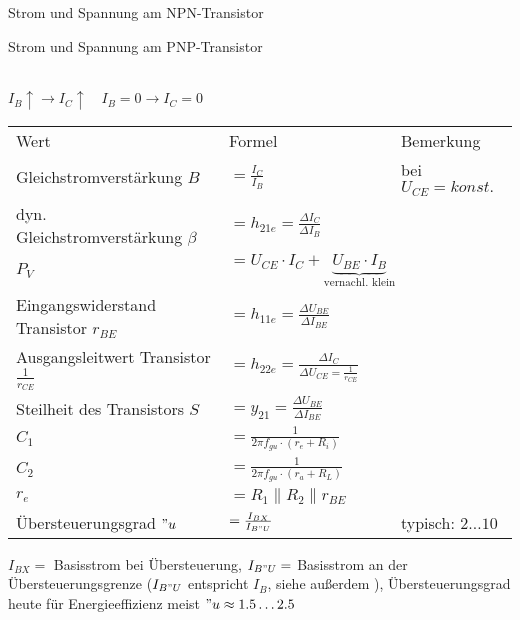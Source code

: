 
\begin{minipage}{0.5\columnwidth}
    Strom und Spannung am NPN-Transistor
\end{minipage}
\begin{minipage}{0.5\columnwidth}
    Strom und Spannung am PNP-Transistor    
\end{minipage}
\noindent\\
$I_B\uparrow\rightarrow I_C\uparrow\quad I_B=0\rightarrow I_C=0$
\renewcommand{\arraystretch}{1.0}
\begin{table}[H]
    \begin{tabularx}{\columnwidth}{l l l}
        Wert                                           & Formel                                                                   & Bemerkung \\
        Gleichstromverstärkung $B$                     & $=\frac{I_C}{I_B}$                                                       & bei $U_{CE}=konst.$ \\
        dyn. Gleichstromverstärkung $\beta$            & $=h_{21e}=\frac{\Delta I_C}{\Delta I_B}$                                 & \\
        $P_V$                                          & $=U_{CE}\cdot I_C + \underbrace{U_{BE}\cdot I_B}_\text{vernachl. klein}$ & \\
        Eingangswiderstand Transistor $r_{BE}$         & $=h_{11e}=\frac{\Delta U_{BE}}{\Delta I_{BE}}$                           & \\
        Ausgangsleitwert Transistor $\frac{1}{r_{CE}}$ & $=h_{22e}=\frac{\Delta I_C}{\Delta U_{CE}=\frac{1}{r_{CE}}}$             & \\
        Steilheit des Transistors $S$                  & $=y_{21}=\frac{\Delta U_{BE}}{\Delta I_{BE}}$                            & \\
        $C_1$                                          & $=\frac{1}{2\pi f_{gu}\cdot (r_e+R_i)}$                                  & \\
        $C_2$                                          & $=\frac{1}{2\pi f_{gu}\cdot (r_a+R_L)}$                                  & \\
        $r_e$                                          & $=R_1\parallel R_2\parallel r_{BE}$                                      & \\
        Übersteuerungsgrad $"u$                        & $=\frac{I_{BX}}{I_{B"U}}$                                                & typisch: $2\dots10$\\
    \end{tabularx}
\end{table}
$I_{BX}=$ Basisstrom bei Übersteuerung, $I_{B"U}=$ Basisstrom an der Übersteuerungsgrenze ($I_{B"U}$ entspricht $I_B$, siehe außerdem ), Übersteuerungsgrad heute für Energieeffizienz meist $"u\approx 1.5\dots 2.5$
